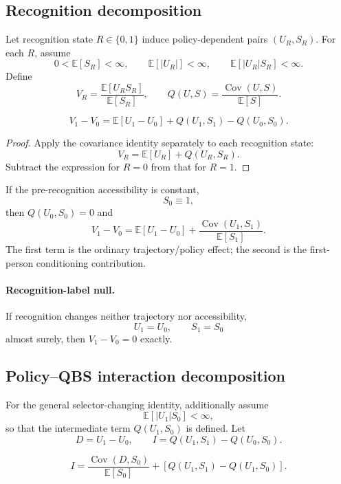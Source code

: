 \subsection{Recognition decomposition}

Let recognition state $R\in\{0,1\}$ induce policy-dependent pairs $(U_R,S_R)$. For each $R$, assume
\[
0<\mathbb E[S_R]<\infty,
\qquad
\mathbb E[|U_R|]<\infty,
\qquad
\mathbb E[|U_R|S_R]<\infty.
\]
Define
\[
V_R
=
\frac{\mathbb E[U_RS_R]}{\mathbb E[S_R]},
\qquad
Q(U,S)
=
\frac{\operatorname{Cov}(U,S)}{\mathbb E[S]}.
\]

\begin{theorem}
\[
V_1-V_0
=
\mathbb E[U_1-U_0]
+
Q(U_1,S_1)-Q(U_0,S_0).
\]
\end{theorem}

\begin{proof}
Apply the covariance identity separately to each recognition state:
\[
V_R
=
\mathbb E[U_R]+Q(U_R,S_R).
\]
Subtract the expression for $R=0$ from that for $R=1$.
\end{proof}

If the pre-recognition accessibility is constant,
\[
S_0\equiv 1,
\]
then $Q(U_0,S_0)=0$ and
\[
V_1-V_0
=
\mathbb E[U_1-U_0]
+
\frac{\operatorname{Cov}(U_1,S_1)}{\mathbb E[S_1]}.
\]
The first term is the ordinary trajectory/policy effect; the second is the first-person conditioning contribution.

\paragraph{Recognition-label null.}
If recognition changes neither trajectory nor accessibility,
\[
U_1=U_0,
\qquad
S_1=S_0
\]
almost surely, then $V_1-V_0=0$ exactly.

\subsection{Policy--QBS interaction decomposition}

For the general selector-changing identity, additionally assume
\[
\mathbb E[|U_1|S_0]<\infty,
\]
so that the intermediate term $Q(U_1,S_0)$ is defined. Let
\[
D=U_1-U_0,
\qquad
I=Q(U_1,S_1)-Q(U_0,S_0).
\]

\begin{theorem}
\[
I
=
\frac{\operatorname{Cov}(D,S_0)}{\mathbb E[S_0]}
+
\left[Q(U_1,S_1)-Q(U_1,S_0)\right].
\]
\end{theorem}

